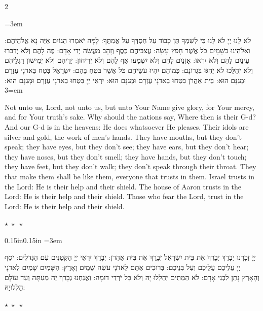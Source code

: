 \documentclass[11pt, openany]{book}
\newenvironment{hebrewblock}{%
  \par\vspace{4pt}
  \begin{adjustwidth}{0.15in}{0.15in}
  \begingroup
  \RTL
  \hebrewfont\large
  \setstretch{1.4}
  \emergencystretch=3em
  \tolerance=9999
  \parindent=0pt\relax
}{%
  \endRTL
  \endgroup
  \end{adjustwidth}
  \par\vspace{2pt}
}
\newcommand{\sederdivider}{%
  \par\vspace{6pt}
  \begin{center}
    \textcolor{sedergold}{\large$\star\;\star\;\star$}
  \end{center}
  \par\vspace{6pt}
}
\newenvironment{bilingual}{%
  \par\vspace{4pt}%
  \begin{paracol}{2}%
}{%
  \end{paracol}%
  \par\vspace{2pt}%
}
\newenvironment{hebrewcol}{%
  \switchcolumn[1]%
  \begingroup
  \RTL
  \hebrewfont\large
  \setstretch{1.4}%
  \emergencystretch=3em
  \tolerance=9999
  \parindent=0pt\relax
}{%
  \endRTL
  \endgroup
}
\newenvironment{englishcol}{%
  \switchcolumn[0]%
  \begingroup
  \setstretch{1.4}%
  \emergencystretch=3em
  \tolerance=9999
  \normalsize
  \rightskip=0.12in\relax
}{%
  \endgroup
}
\newcommand{\parasep}{%
  \par\vspace{3pt}
  \begin{center}
    \textcolor{sedergold!50}{\small$\star\;\star\;\star$}
  \end{center}
  \par\vspace{3pt}
}
\begin{document}
\begin{bilingual}
\begin{hebrewcol}
לֹא לָנוּ יְיָ לֹא לָנוּ כִּי לְשִׁמְךָ תֵּן כָּבוֹד עַל חַסְדְּךָ עַל אֲמִתֶּךָ: לָמָּה יֹאמְרוּ הַגּוֹיִם אַיֵּה נָא אֱלֹהֵיהֶם: וֵאלֹהֵינוּ בַשָּׁמָיִם כֹּל אֲשֶׁר חָפֵץ עָשָׂה: עֲצַבֵּיהֶם כֶּסֶף וְזָהָב מַעֲשֵׂה יְדֵי אָדָם: פֶּה לָהֶם וְלֹא יְדַבֵּרוּ עֵינַיִם לָהֶם וְלֹא יִרְאוּ: אָזְנַיִם לָהֶם וְלֹא יִשְׁמָעוּ אַף לָהֶם וְלֹא יְרִיחוּן: יְדֵיהֶם וְלֹא יְמִישׁוּן רַגְלֵיהֶם וְלֹא יְהַלֵּכוּ לֹא יֶהְגּוּ בִּגְרוֹנָם: כְּמוֹהֶם יִהְיוּ עֹשֵׂיהֶם כֹּל אֲשֶׁר בֹּטֵחַ בָּהֶם: יִשְׂרָאֵל בְּטַח בַּאדֹנָי עֶזְרָם וּמָגִנָּם הוּא: בֵּית אַהֲרֹן בִּטְחוּ בַאדֹנָי עֶזְרָם וּמָגִנָּם הוּא: יִרְאֵי יְיָ בִּטְחוּ בַאדֹנָי עֶזְרָם וּמָגִנָּם הוּא:
\end{hebrewcol}
\begin{englishcol}
Not unto us, Lord, not unto us, but unto Your Name give glory, for Your mercy, and for Your truth's sake. Why should the nations say, Where then is their G-d? And our G-d is in the heavens: He does whatsoever He pleases. Their idols are silver and gold, the work of men's hands. They have mouths, but they don't speak; they have eyes, but they don't see; they have ears, but they don't hear; they have noses, but they don't smell; they have hands, but they don't touch; they have feet, but they don't walk; they don't speak through their throat. They that make them shall be like them, everyone that trusts in them. Israel trusts in the Lord: He is their help and their shield. The house of Aaron trusts in the Lord: He is their help and their shield. Those who fear the Lord, trust in the Lord: He is their help and their shield.
\end{englishcol}
\end{bilingual}
\parasep

\begin{hebrewblock}
יְיָ זְכָרָנוּ יְבָרֵךְ יְבָרֵךְ אֶת בֵּית יִשְׂרָאֵל יְבָרֵךְ אֶת בֵּית אַהֲרֹן: יְבָרֵךְ יִרְאֵי יְיָ הַקְּטַנִּים עִם הַגְּדֹלִים: יֹסֵף יְיָ עֲלֵיכֶם עֲלֵיכֶם וְעַל בְּנֵיכֶם: בְּרוּכִים אַתֶּם לַאדֹנָי עֹשֵׂה שָׁמַיִם וָאָרֶץ: הַשָּׁמַיִם שָׁמַיִם לַאדֹנָי וְהָאָרֶץ נָתַן לִבְנֵי אָדָם: לֹא הַמֵּתִים יְהַלְלוּ יָהּ וְלֹא כָּל יֹרְדֵי דוּמָה: וַאֲנַחְנוּ נְבָרֵךְ יָהּ מֵעַתָּה וְעַד עוֹלָם הַלְלוּיָהּ:
\end{hebrewblock}

\sederdivider
\end{document}
